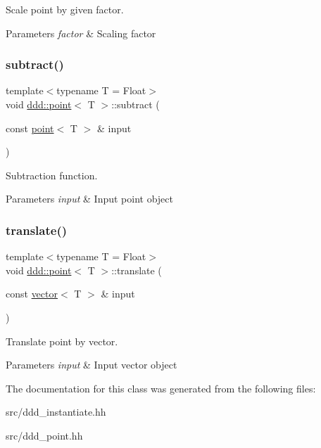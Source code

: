 Scale point by given factor. 


\begin{DoxyParams}{Parameters}
{\em factor} & Scaling factor \\
\hline
\end{DoxyParams}
\mbox{\label{classddd_1_1point_abf2e2ea5474534eb17d1cb6bd96b7913}} 
\subsubsection{\texorpdfstring{subtract()}{subtract()}}
{\footnotesize\ttfamily template$<$typename T = Float$>$ \\
void \hyperlink{classddd_1_1point}{ddd\+::point}$<$ T $>$\+::subtract (\begin{DoxyParamCaption}\item[{const \hyperlink{classddd_1_1point}{point}$<$ T $>$ \&}]{input }\end{DoxyParamCaption})\hspace{0.3cm}{\ttfamily [inline]}}



Subtraction function. 


\begin{DoxyParams}{Parameters}
{\em input} & Input point object \\
\hline
\end{DoxyParams}
\mbox{\label{classddd_1_1point_a36c06fef72376a058c663dd9632ddcd0}} 
\subsubsection{\texorpdfstring{translate()}{translate()}}
{\footnotesize\ttfamily template$<$typename T = Float$>$ \\
void \hyperlink{classddd_1_1point}{ddd\+::point}$<$ T $>$\+::translate (\begin{DoxyParamCaption}\item[{const \hyperlink{classddd_1_1vector}{vector}$<$ T $>$ \&}]{input }\end{DoxyParamCaption})\hspace{0.3cm}{\ttfamily [inline]}}



Translate point by vector. 


\begin{DoxyParams}{Parameters}
{\em input} & Input vector object \\
\hline
\end{DoxyParams}


The documentation for this class was generated from the following files\+:\begin{DoxyCompactItemize}
\item 
src/ddd\+\_\+instantiate.\+hh\item 
src/ddd\+\_\+point.\+hh\end{DoxyCompactItemize}
